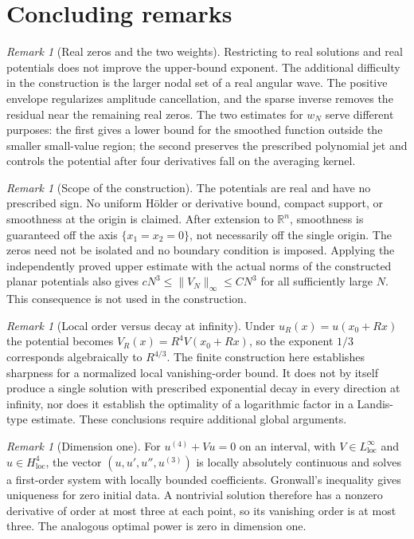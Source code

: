 \documentclass[11pt,twoside,leqno]{article}
\numberwithin{equation}{section}
\theoremstyle{definition}
\theoremstyle{remark}
\newtheorem{remark}[theorem]{Remark}
\newcommand{\R}{\mathbb R}
\newcommand{\loc}{\mathrm{loc}}
\begin{document}
\section{Concluding remarks}\label{sec:remarks}

\begin{remark}[Real zeros and the two weights]
Restricting to real solutions and real potentials does not improve the
upper-bound exponent. The additional difficulty in the construction
is the larger nodal set of a real angular wave. The positive envelope
regularizes amplitude cancellation, and the sparse inverse removes
the residual near the remaining real zeros. The two estimates for
$w_N$ serve different purposes: the first gives a lower bound for the
smoothed function outside the smaller small-value region; the second
preserves the prescribed polynomial jet and controls the potential
after four derivatives fall on the averaging kernel.
\end{remark}

\begin{remark}[Scope of the construction]
The potentials are real and have no prescribed sign. No uniform
H\"older or derivative bound, compact support, or smoothness at the
origin is claimed. After extension to $\R^n$, smoothness is guaranteed
off the axis $\{x_1=x_2=0\}$, not necessarily off the single origin.
The zeros need not be isolated and no boundary condition is imposed.
Applying the independently proved upper estimate with the actual
norms of the constructed planar potentials also gives
$cN^3\le\|V_N\|_\infty\le CN^3$ for all sufficiently large $N$.
This consequence is not used in the construction.
\end{remark}

\begin{remark}[Local order versus decay at infinity]
Under $u_R(x)=u(x_0+Rx)$ the potential becomes
$V_R(x)=R^4V(x_0+Rx)$, so the exponent $1/3$ corresponds algebraically to $R^{4/3}$.
The finite construction here establishes sharpness for a normalized
local vanishing-order bound. It does not by itself produce a single
solution with prescribed exponential decay in every direction at
infinity, nor does it establish the optimality of a logarithmic factor
in a Landis-type estimate. These conclusions require additional global
arguments.
\end{remark}

\begin{remark}[Dimension one]
For $u^{(4)}+Vu=0$ on an interval, with $V\in L^\infty_{\loc}$ and
$u\in H^4_{\loc}$, the vector $(u,u',u'',u^{(3)})$ is locally
absolutely continuous and solves a first-order system with locally
bounded coefficients. Gronwall's inequality gives uniqueness for zero
initial data. A nontrivial solution therefore has a nonzero derivative
of order at most three at each point, so its vanishing order is at most
three. The analogous optimal power is zero in dimension one.
\end{remark}
\end{document}
